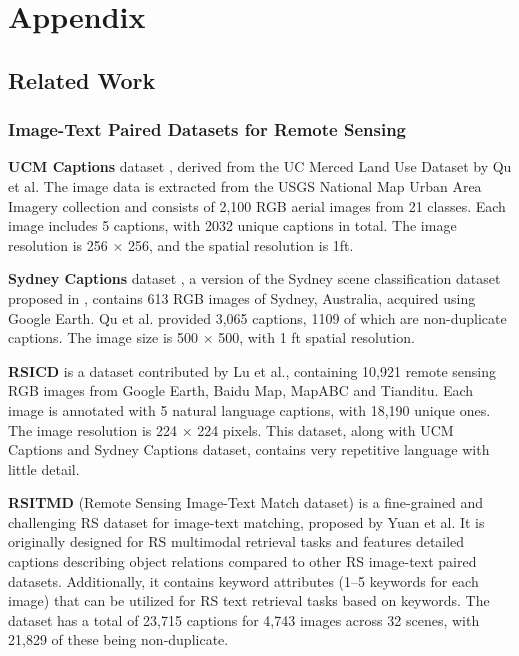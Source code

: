 \documentclass[journal]{IEEEtran}
\begin{document}






\appendix
\section{Appendix}
\subsection{Related Work}
\label{appendix:related_work}
\subsubsection{Image-Text Paired Datasets for Remote Sensing}

\textbf{UCM Captions} dataset \cite{UCMSydeney}, derived from the UC Merced Land Use Dataset \cite{ucm} by Qu et al. The image data is extracted from the USGS National Map Urban Area Imagery collection and consists of 2,100 RGB aerial images from 21 classes. Each image includes 5 captions, with 2032 unique captions in total. The image resolution is 256 $\times$ 256, and the spatial resolution is 1ft. 


\textbf{Sydney Captions} dataset \cite{UCMSydeney}, a version of the Sydney scene classification dataset proposed in \cite{6910306}, contains 613 RGB images of Sydney, Australia, acquired using Google Earth. Qu et al. provided 3,065 captions, 1109 of which are non-duplicate captions. The image size is 500 $\times$ 500, with 1 ft spatial resolution.


\textbf{RSICD} \cite{RSICD} is a dataset contributed by Lu et al., containing 10,921 remote sensing RGB images from Google Earth, Baidu Map, MapABC and Tianditu. Each image is annotated with 5 natural language captions, with 18,190 unique ones. The image resolution is 224 $\times$ 224 pixels. This dataset, along with UCM Captions and Sydney Captions dataset, contains very repetitive language with little detail.


\textbf{RSITMD} \cite{RSITMD} (Remote Sensing Image-Text Match dataset) is a fine-grained and challenging RS dataset for image-text matching, proposed by Yuan et al. It is originally designed for RS multimodal retrieval tasks and features detailed captions describing object relations compared to other RS image-text paired datasets. Additionally, it contains keyword attributes (1–5 keywords for each image) that can be utilized for RS text retrieval tasks based on keywords. The dataset has a total of 23,715 captions for 4,743 images across 32 scenes, with 21,829 of these being non-duplicate.
\end{document}

